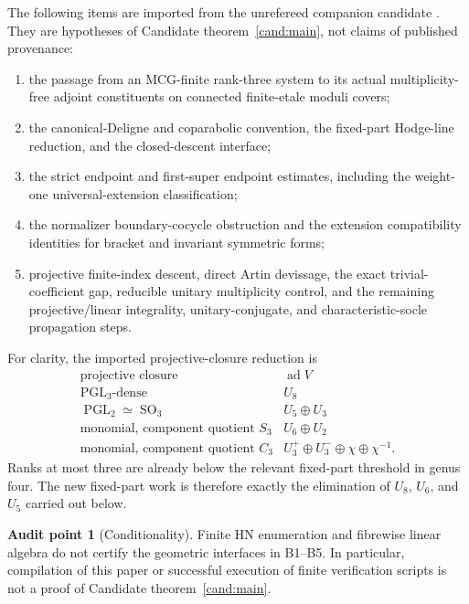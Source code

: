 \documentclass[11pt]{article}
\theoremstyle{definition}
\newtheorem{audit}[theorem]{Audit point}
\newcommand{\ad}{\operatorname{ad}}
\newcommand{\PGL}{\operatorname{PGL}}
\newcommand{\SO}{\operatorname{SO}}
\begin{document}
The following items are imported from the unrefereed companion candidate
\cite{SneidermanG5}.  They are hypotheses of Candidate
theorem~\ref{cand:main}, not claims of published provenance:
\begin{enumerate}[label=\textup{B\arabic*},leftmargin=3.2em]
\item the passage from an MCG-finite rank-three system to its actual
multiplicity-free adjoint constituents on connected finite-etale moduli
covers;
\item the canonical-Deligne and coparabolic convention, the fixed-part
Hodge-line reduction, and the closed-descent interface;
\item the strict endpoint and first-super endpoint estimates, including the
weight-one universal-extension classification;
\item the normalizer boundary-cocycle obstruction and the extension
compatibility identities for bracket and invariant symmetric forms;
\item projective finite-index descent, direct Artin devissage, the exact
trivial-coefficient gap, reducible unitary multiplicity control, and the
remaining projective/linear integrality, unitary-conjugate, and
characteristic-socle propagation steps.
\end{enumerate}

For clarity, the imported projective-closure reduction is
\[
\begin{array}{c|c}
\text{projective closure}&\ad V\\ \hline
\PGL_3\text{-dense}&U_8\\
\PGL_2\simeq\SO_3&U_5\oplus U_3\\
\text{monomial, component quotient }S_3&U_6\oplus U_2\\
\text{monomial, component quotient }C_3&
 U_3^+\oplus U_3^-\oplus\chi\oplus\chi^{-1}.
\end{array}
\]
Ranks at most three are already below the relevant fixed-part threshold in
genus four.  The new fixed-part work is therefore exactly the elimination of
$U_8$, $U_6$, and $U_5$ carried out below.

\begin{audit}[Conditionality]
Finite HN enumeration and fibrewise linear algebra do not certify the
geometric interfaces in B1--B5.  In particular, compilation of this paper or
successful execution of finite verification scripts is not a proof of
Candidate theorem~\ref{cand:main}.
\end{audit}
\end{document}
